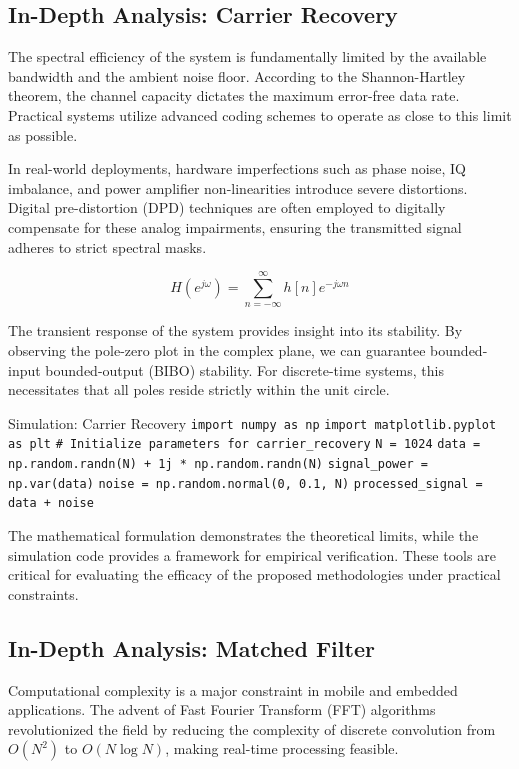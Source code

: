 \subsection{In-Depth Analysis: Carrier Recovery}
The spectral efficiency of the system is fundamentally limited by the available bandwidth and the ambient noise floor. According to the Shannon-Hartley theorem, the channel capacity dictates the maximum error-free data rate. Practical systems utilize advanced coding schemes to operate as close to this limit as possible.

In real-world deployments, hardware imperfections such as phase noise, IQ imbalance, and power amplifier non-linearities introduce severe distortions. Digital pre-distortion (DPD) techniques are often employed to digitally compensate for these analog impairments, ensuring the transmitted signal adheres to strict spectral masks.

\begin{equation}
    H(e^{j\omega}) = \sum_{n=-\infty}^{\infty} h[n] e^{-j\omega n}
\end{equation}

The transient response of the system provides insight into its stability. By observing the pole-zero plot in the complex plane, we can guarantee bounded-input bounded-output (BIBO) stability. For discrete-time systems, this necessitates that all poles reside strictly within the unit circle.

\begin{pythonbox}{Simulation: Carrier Recovery}
\texttt{import numpy as np}
\texttt{import matplotlib.pyplot as plt}
\texttt{}
\texttt{\# Initialize parameters for carrier\_recovery}
\texttt{N = 1024}
\texttt{data = np.random.randn(N) + 1j * np.random.randn(N)}
\texttt{signal\_power = np.var(data)}
\texttt{noise = np.random.normal(0, 0.1, N)}
\texttt{processed\_signal = data + noise}
\end{pythonbox}

\vspace{0.5cm}
The mathematical formulation demonstrates the theoretical limits, while the simulation code provides a framework for empirical verification. These tools are critical for evaluating the efficacy of the proposed methodologies under practical constraints.


\subsection{In-Depth Analysis: Matched Filter}
Computational complexity is a major constraint in mobile and embedded applications. The advent of Fast Fourier Transform (FFT) algorithms revolutionized the field by reducing the complexity of discrete convolution from $O(N^2)$ to $O(N \log N)$, making real-time processing feasible.

